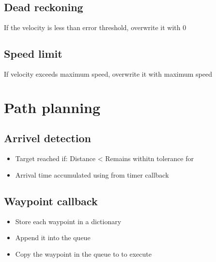 \documentclass[letterpaper,10pt,english]{sphinxmanual}
\begin{document}
\subsection{Dead reckoning}
\label{\detokenize{technical_reference:dead-reckoning}}
\sphinxAtStartPar
If the velocity is less than error threshold, overwrite it with 0


\subsection{Speed limit}
\label{\detokenize{technical_reference:speed-limit}}
\sphinxAtStartPar
If velocity exceeds maximum speed, overwrite it with maximum speed


\section{Path planning}
\label{\detokenize{technical_reference:path-planning}}

\subsection{Arrivel detection}
\label{\detokenize{technical_reference:arrivel-detection}}\begin{itemize}
\item {} 
\sphinxAtStartPar
Target reached if:
\sphinxhyphen{} Distance \textless{} 
\sphinxhyphen{} Remains withitn tolerance for 

\item {} 
\sphinxAtStartPar
Arrival time accumulated using  from timer callback

\end{itemize}


\subsection{Waypoint callback}
\label{\detokenize{technical_reference:waypoint-callback}}\begin{itemize}
\item {} 
\sphinxAtStartPar
Store each waypoint in a dictionary

\item {} 
\sphinxAtStartPar
Append it into the queue

\item {} 
\sphinxAtStartPar
Copy the waypoint in the queue to  to execute

\end{itemize}
\end{document}

